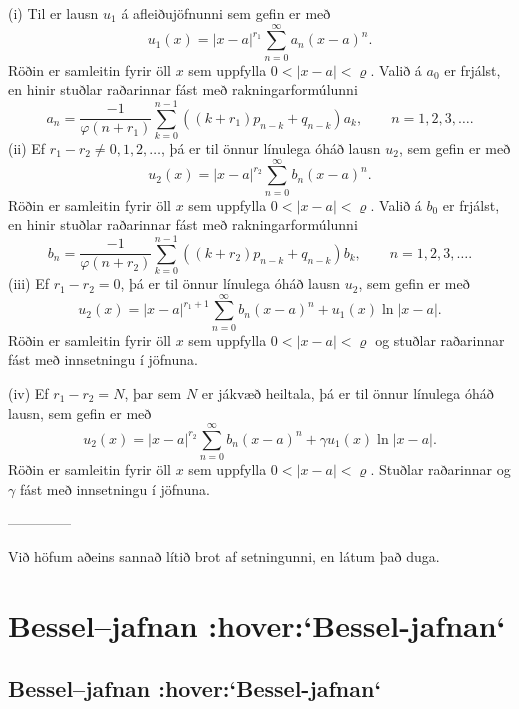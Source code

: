 (i) Til er lausn $u_1$ á afleiðujöfnunni  sem gefin er með 
 $$u_1(x)=|x-a|^{r_1}\sum_{n=0}^\infty a_n(x-a)^n.
 $$
Röðin er samleitin fyrir öll $x$ sem uppfylla $0<|x-a|<\varrho$.
Valið á $a_0$ er frjálst, en hinir 
stuðlar raðarinnar  fást með rakningarformúlunni
 $$
a_n=\dfrac{-1}{\varphi(n+r_1)}
\sum_{k=0}^{n-1}((k+r_1)p_{n-k}+q_{n-k})a_k, \qquad n=1,2,3,\dots.
 $$
(ii) Ef $r_1-r_2\neq 0,1,2,\dots$, þá er til önnur línulega óháð 
lausn $u_2$,  sem gefin er með 
 $$u_2(x)=|x-a|^{r_2}\sum_{n=0}^\infty b_n(x-a)^n.
 $$
Röðin er samleitin fyrir öll $x$ sem uppfylla $0<|x-a|<\varrho$.
Valið á $b_0$ er frjálst, en hinir
stuðlar raðarinnar fást með rakningarformúlunni
 $$
b_n=\dfrac{-1}{\varphi(n+r_2)}
\sum_{k=0}^{n-1}((k+r_2)p_{n-k}+q_{n-k})b_k, \qquad n=1,2,3,\dots.
 $$
(iii) Ef $r_1-r_2=0$, þá er til önnur línulega óháð lausn $u_2$,
sem gefin er með 
 $$u_2(x)=|x-a|^{r_1+1}\sum_{n=0}^\infty b_n(x-a)^n+
u_1(x)\ln|x-a|.
 $$
Röðin er samleitin fyrir öll $x$ sem uppfylla $0<|x-a|<\varrho$ og
stuðlar raðarinnar  fást með innsetningu í jöfnuna.

\smallskip\noindent
(iv) Ef $r_1-r_2=N$, þar sem $N$ er jákvæð heiltala, þá er til önnur
línulega óháð lausn, sem gefin er með 
 $$u_2(x)=|x-a|^{r_2}\sum_{n=0}^\infty b_n(x-a)^n+
\gamma u_1(x)\ln|x-a|.
 $$
Röðin er samleitin fyrir öll $x$ sem uppfylla $0<|x-a|<\varrho$.
Stuðlar raðarinnar og $\gamma$  fást með innsetningu í jöfnuna.


--------------



Við höfum aðeins sannað lítið brot af setningunni, en látum það duga.


\section{Bessel--jafnan :hover:`Bessel-jafnan`}

\subsection{Bessel--jafnan :hover:`Bessel-jafnan`}


